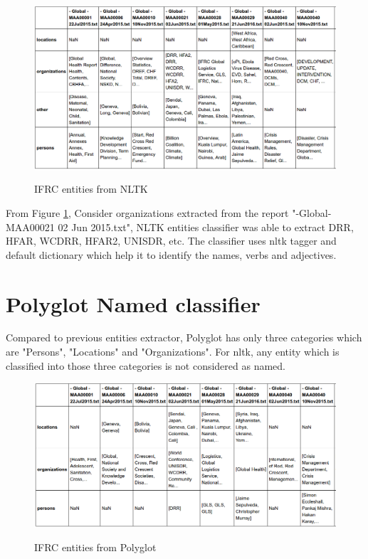 \begin{figure}[hbtp]
\caption{IFRC entities from NLTK}
\centering
\includegraphics[scale=.45]{images/nltkalgo.png}\label{nltkalgo}
\end{figure}

From Figure \ref{nltkalgo}, Consider organizations extracted from the report "-Global-MAA00021 02 Jun 2015.txt", NLTK entities classifier was able to extract DRR, HFAR, WCDRR, HFAR2, UNISDR, etc. The classifier uses nltk tagger and default dictionary which help it to identify the names, verbs and adjectives.

\section{Polyglot Named classifier}

Compared to previous entities extractor, Polyglot has only three categories which are "Persons", "Locations" and "Organizations". For nltk, any entity which is classified into those three categories is not considered as named.

\begin{figure}[hbtp]
\caption{IFRC entities from Polyglot}
\centering
\includegraphics[scale=.45]{images/polyglot.png}\label{polyglot}
\end{figure}


